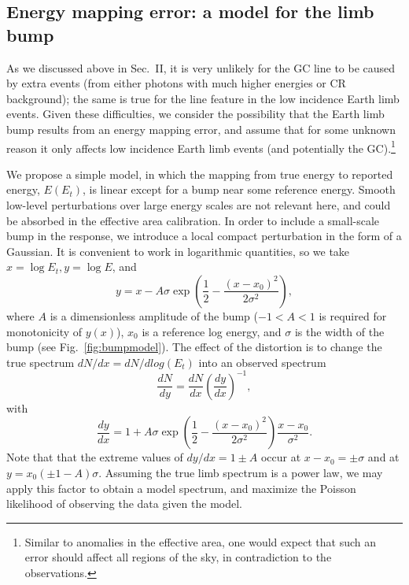 \documentclass[aps,twocolumn,prd,superscriptaddress,showpacs,nofootinbib,fixfloat]{revtex4}
\newcommand{\be}{\begin{equation}}
\newcommand{\ee}{\end{equation}}
\begin{document}
\subsection{Energy mapping error: a model for the limb bump}

 
As we discussed above in Sec.~II, it is very unlikely for the
GC line to be caused by extra events (from either photons with much higher
energies or CR background); the same is true for the line feature in the low
incidence Earth limb events.  Given these difficulties, we consider the
possibility that the Earth limb bump results from an energy mapping error, and
assume that for some unknown reason it only affects low incidence Earth limb
events (and potentially the GC).\footnote{Similar to anomalies in the
effective area, one would expect that such an error should affect all
regions of the sky, in contradiction to the observations.}

We propose a simple model, in
which the mapping from true energy to reported energy,
$E(E_t)$, is linear except for a bump near some reference
energy.  Smooth low-level perturbations over large energy
scales are not relevant here, and could be absorbed in the
effective area calibration.  In order to include a
small-scale bump in the response, we introduce a local
compact perturbation in the form of a Gaussian.  It is
convenient to work in logarithmic quantities, so we take
$x=\log E_t, y=\log E$, and \be
\label{eq:yofx}
y=x - A\sigma \exp\left(\frac{1}{2}-\frac{(x-x_0)^2}{2\sigma^2}\right),
\ee
where $A$ is a dimensionless amplitude of the bump ($-1<A<1$
is required for monotonicity of $y(x)$), $x_0$ is a
reference log energy, and $\sigma$ is the width of the bump (see
Fig.~\ref{fig:bumpmodel}).  The effect of the distortion is
to change the true spectrum $dN/dx = dN/dlog(E_t)$ into an
observed spectrum
\be
\label{eq:dndy}
\frac{dN}{dy} = \frac{dN}{dx} \left(\frac{dy}{dx}\right)^{-1} ,
\ee
with
\be
\label{eq:dydx}
\frac{dy}{dx} = 1 + A\sigma \exp\left(\frac{1}{2}-\frac{(x-x_0)^2}{2\sigma^2}\right)
\frac{x-x_0}{\sigma^2}.
\ee
Note that that the extreme values of $dy/dx = 1 \pm A$ occur
at $x-x_0 = \pm \sigma$ and at $y=x_0(\pm1-A)\sigma$.
Assuming the true limb spectrum is a power law, we may apply
this factor to obtain a model spectrum, and maximize the
Poisson likelihood of observing the data given the model.
\end{document}
